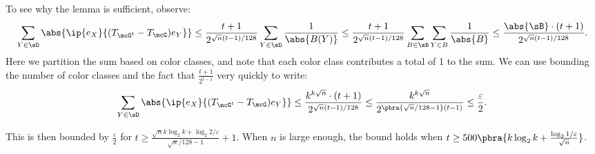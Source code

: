 To see why the lemma is sufficient, observe:
\begin{equation*}
    \sum_{Y \in \sD} \abs{\ip{e_X}{(T_{\mcG^t}-T_{\mcG}) e_Y}} 
    \leq \frac{t+1}{2^{\sqrt{n}(t-1)/128}} \sum_{Y \in \sD} \frac{1}{\abs{B(Y)}} 
    \leq \frac{t+1}{2^{\sqrt{n}(t-1)/128}}\sum_{B \in \sB} \sum_{Y \in B} \frac{1}{\abs{B}} \leq \frac{\abs{\sB} \cdot (t+1)}{2^{\sqrt{n}(t-1)/128}}.
\end{equation*}
Here we partition the sum based on color classes, and note that each color class contributes a total of 1 to the sum. We can use  bounding the number of color classes and the fact that $\frac{t+1}{2^{t-1}}$ very quickly to write:
\begin{equation*}
    \sum_{Y \in \sD} \abs{\ip{e_X}{(T_{\mcG^t}-T_{\mcG}) e_Y}} 
    \leq \frac{k^{k\sqrt{n}} \cdot (t+1)}{2^{\sqrt{n}(t-1)/128}} \leq \frac{k^{k\sqrt{n}}}{2^{\pbra{\sqrt{n}/128-1} (t-1)}} \leq \frac{\varepsilon}{2}.
\end{equation*}

This is then bounded by $\frac\varepsilon2$ for $t \geq  \frac{\sqrt{n}k\log_2 k + \log_2 2/\varepsilon}{\sqrt{n}/128-1}+1$. When $n$ is large enough, the bound holds when $t\geq 500\pbra{k \log_2 k + \frac{\log_2 1/\varepsilon}{\sqrt{n}}}$.

